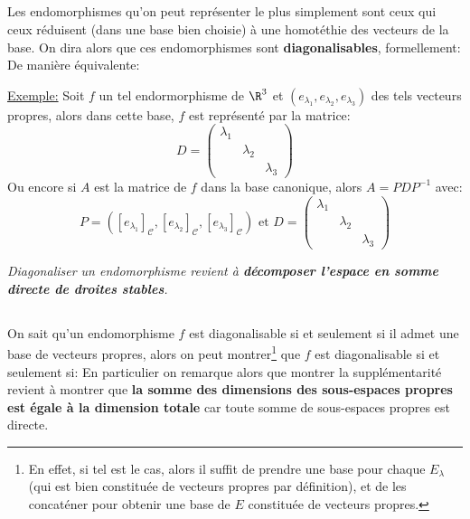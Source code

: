 \subsection*{}
Les endomorphismes qu'on peut représenter le plus simplement sont ceux qui ceux réduisent (dans une base bien choisie) à une homotéthie des vecteurs de la base. On dira alors que ces endomorphismes sont \textbf{diagonalisables}, formellement:
De manière équivalente:

\underline{Exemple:} Soit \(f\) un tel endormorphisme de \(\R^3\) et \((e_{\lambda_1}, e_{\lambda_2}, e_{\lambda_3})\) des tels vecteurs propres, alors dans cette base, \(f\) est représenté par la matrice:
\[
   D = \left(\begin{array}{ccc}
      \lambda_1 & {} & {}\\
      {} & \lambda_2 & {}\\
      {} & {} & \lambda_3
   \end{array}\right) 
\]
Ou encore si \(A\) est la matrice de \(f\) dans la base canonique, alors \(A = PDP^{-1}\) avec:
\[
   P = ([e_{\lambda_1}]_\mathscr{C}, [e_{\lambda_2}]_\mathscr{C}, [e_{\lambda_3}]_\mathscr{C}) \text{ et } D = \left(\begin{array}{ccc}
      \lambda_1 & {} & {}\\
      {} & \lambda_2 & {}\\
      {} & {} & \lambda_3
   \end{array}\right) 
\]
\begin{center}
   \textit{Diagonaliser un endomorphisme revient à \textbf{décomposer l'espace en somme directe de droites stables}.
   }
\end{center}
\pagebreak

\subsection*{}
On sait qu'un endomorphisme \(f\) est diagonalisable si et seulement si il admet une base de vecteurs propres, alors on peut montrer\footnote[1]{En effet, si tel est le cas, alors il suffit de prendre une base pour chaque \(E_\lambda\) (qui est bien constituée de vecteurs propres par définition), et de les concaténer pour obtenir une base de \(E\) constituée de vecteurs propres.} que \(f\) est diagonalisable si et seulement si:
En particulier on remarque alors que montrer la supplémentarité revient à montrer que \textbf{la somme des dimensions des sous-espaces propres est égale à la dimension totale} car toute somme de sous-espaces propres est directe.\<

